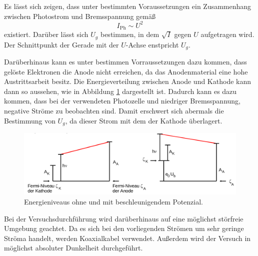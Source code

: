 Es lässt sich zeigen, dass unter bestimmten Voraussetzungen ein Zusammenhang zwischen Photostrom und Bremsspannung gemäß
\begin{equation}
    I_{\text{Ph}}\sim U^2
\end{equation}
existiert.
Darüber lässt sich $U_g$ bestimmen, in dem $\sqrt{I}$ gegen $U$ aufgetragen wird. Der Schnittpunkt der Gerade mit der $U$-Achse enstpricht $U_g$.

Darüberhinaus kann es unter bestimmen Vorraussetzungen dazu kommen, dass gelöste Elektronen die Anode nicht erreichen, da das Anodenmaterial eine hohe Austrittsarbeit besitz. Die Energieverteilung zwischen Anode und Kathode kann dann so aussehen, wie in Abbildung \ref{fig:Energie} dargestellt ist.
Dadurch kann es dazu kommen, dass bei der verwendeten Photozelle und niedriger Bremsspannung, negative Ströme zu beobachten sind. Damit erschwert sich abermals die Bestimmung von $U_g$, da dieser Strom mit dem der Kathode überlagert.

\begin{figure}
\centering
\includegraphics[width=\textwidth]{data/Energie.png}
\caption{Energieniveaus ohne und mit beschleunigendem Potenzial.}
\label{fig:Energie}
\end{figure}


Bei der Versuchsdurchführung wird darüberhinaus auf eine möglichst störfreie Umgebung geachtet. Da es sich bei den vorliegenden Strömen um sehr geringe Ströma handelt, werden Koaxialkabel verwendet. Außerdem wird der Versuch in möglichst absoluter Dunkelheit durchgeführt.














